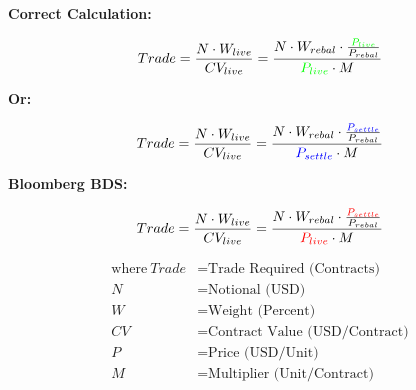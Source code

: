 \documentclass[20pt,letterpaper]{article}
\author{Jake DeSantis}
\begin{document}
\Huge

\begin{center}
\textbf{Correct Calculation:}

\end{center}


\LARGE

$$
Trade = 
\frac{N \cdot W_{live}} {CV_{live}} = 
\frac{N \cdot W_{rebal} \cdot \frac{\textcolor{green}{P_{live}}}{P_{rebal}}} {\textcolor{green}{P_{live}} \cdot M}
$$

\vspace{10mm}


\begin{center}

\Large
\textbf{Or:}
\LARGE

$$
Trade = 
\frac{N \cdot W_{live}} {CV_{live}} = 
\frac{N \cdot W_{rebal} \cdot \frac{\textcolor{blue}{P_{settle}}}{P_{rebal}}} {\textcolor{blue}{P_{settle}} \cdot M}
$$

\vspace{20mm}

\end{center}
\Huge
\begin{center}
\textbf{Bloomberg BDS:}
\end{center}

\LARGE

$$
Trade = 
\frac{N \cdot W_{live}} {CV_{live}} = 
\frac{N \cdot W_{rebal} \cdot \frac{\textcolor{red}{P_{settle}}}{P_{rebal}}} {\textcolor{red}{P_{live}} \cdot M}
$$

\vspace{20mm}



\normalsize

\begin{align*}
  \text{where}~Trade &= \text{Trade Required (Contracts)}\\
  N &= \text{Notional (USD)} \\
  W &= \text{Weight (Percent)}\\
  CV &= \text{Contract Value (USD/Contract)}\\
   P &= \text{Price (USD/Unit)}\\
   M &= \text{Multiplier (Unit/Contract)}
\end{align*}
\end{document}
